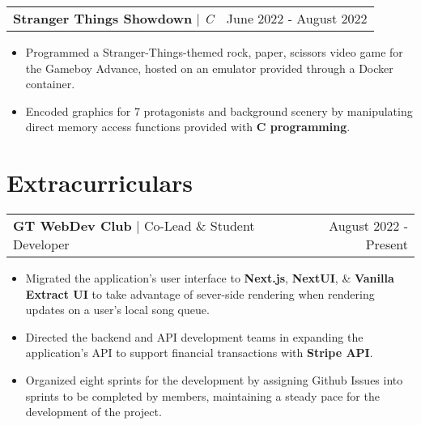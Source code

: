 \documentclass[letterpaper,11pt]{article}
\makeatletter
\newcommand{\resumeExperienceHeading}[3]{
    \begin{tabular*}{0.99\textwidth}[t]{l@{\extracolsep{\fill}}r}
      \textbf{#1} $\vert$ {#2} & {#3} \\
    \end{tabular*}\vspace{-3pt}
}
\newcommand{\resumeProjectHeading}[3]{
    \begin{tabular*}{0.97\textwidth}[t]{l@{\extracolsep{\fill}}r}
      \textbf{#1} $\vert$ \textit{#2}  & {#3}
    \end{tabular*}\vspace{-3pt}
}
\newcommand{\resumeItemListStart}{\begin{itemize}[noitemsep]\vspace{-4pt}}
\newcommand{\resumeItemListEnd}{\end{itemize}}
\makeatother
\begin{document}
    \resumeProjectHeading{Stranger Things Showdown}{C}{June 2022 - August 2022}
      \resumeItemListStart
        \item {Programmed a Stranger-Things-themed rock, paper, scissors video game for the Gameboy Advance, hosted on an emulator provided through a Docker container.}
        \item {Encoded graphics for 7 protagonists and background scenery by manipulating direct memory access functions provided with \textbf{C programming}.}
      \resumeItemListEnd

\section{Extracurriculars}
  \resumeExperienceHeading{GT WebDev Club}{Co-Lead \& Student Developer}{August 2022 - Present}
    \resumeItemListStart
      \item {Migrated the application's user interface to \textbf{Next.js}, \textbf{NextUI}, \& \textbf{Vanilla Extract UI} to take advantage of sever-side rendering when rendering updates on a user's local song queue.}
      \item {Directed the backend and API development teams in expanding the application's API to support financial transactions with \textbf{Stripe API}.}
      \item {Organized eight sprints for the development by assigning Github Issues into sprints to be completed by members, maintaining a steady pace for the development of the project.}
    \resumeItemListEnd
\end{document}
